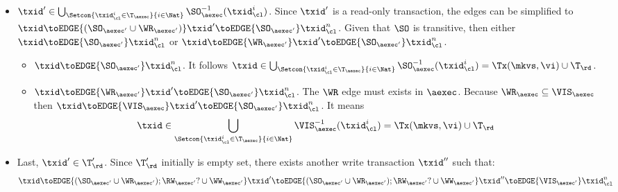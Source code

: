 \begin{itemize}
\begin{itemize}
\begin{itemize}
        By the invariant \( I_1 \), it means \( \txid \in \Tx(\mkvs, \vi) \cup \T_\rd \).
    \item \( \txid' \in \bigcup_{\Setcon{\txid_{\cl}^{i} \in \T_{\aexec} }{ i \in \Nat }} \SO_{\aexec}^{-1}(\txid^i_\cl) \).
    Since \( \txid' \) is a read-only transaction, 
    the edges can be simplified to \( \txid \toEDGE{(\SO_{\aexec'} \cup \WR_{\aexec'} )} \txid' \toEDGE{\SO_{\aexec'}}  \txid_\cl^n \).
    Given that \( \SO \) is transitive, then  either \( \txid \toEDGE{\SO_{\aexec'}} \txid_\cl^n \) or \( \txid \toEDGE{\WR_{\aexec'} } \txid' \toEDGE{\SO_{\aexec'}}  \txid_\cl^n \).
    \begin{itemize}
        \item \( \txid \toEDGE{\SO_{\aexec'}} \txid_\cl^n \).
            It follows \( \txid \in \bigcup_{\Setcon{\txid_{\cl}^{i} \in \T_{\aexec} }{ i \in \Nat }} \SO_{\aexec}^{-1}(\txid^i_\cl) = \Tx(\mkvs, \vi) \cup \T_\rd \).
        \item \( \txid \toEDGE{\WR_{\aexec'} } \txid' \toEDGE{\SO_{\aexec'}}  \txid_\cl^n \).
            The \( \WR \) edge must exists in \( \aexec \).
            Because \( \WR_\aexec \subseteq \VIS_\aexec \) then  \( \txid \toEDGE{\VIS_{\aexec} } \txid' \toEDGE{\SO_{\aexec'}}  \txid_\cl^n  \).
            It means 
            \[ 
                \txid \in \bigcup_{\Setcon{\txid_{\cl}^{i} \in \T_{\aexec} }{ i \in \Nat }} \VIS_{\aexec}^{-1}(\txid^i_\cl) = \Tx(\mkvs, \vi) \cup \T_\rd 
            \]
    \end{itemize}
    \item 
    Last, \( \txid' \in \T'_\rd \).
    Since \( \T'_\rd \) initially is empty set, there exists another write transaction \( \txid'' \) such that:
    \[
        \txid \toEDGE{(\SO_{\aexec'} \cup \WR_{\aexec'} ) ; \RW_{\aexec'}? \cup \WW_{\aexec'}} \txid' \toEDGE{(\SO_{\aexec'} \cup \WR_{\aexec'} ) ; \RW_{\aexec'}? \cup \WW_{\aexec'}} \txid'' \toEDGE{\VIS_{\aexec'}}  \txid_\cl^n
    \]

\end{itemize}
\end{itemize}
\end{itemize}
